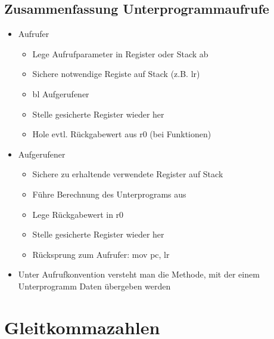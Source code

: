 		
	\subsection{Zusammenfassung Unterprogrammaufrufe}
		\begin{itemize}
			\item Aufrufer
				\begin{itemize}
					\item Lege Aufrufparameter in Register oder Stack ab
					\item Sichere notwendige Registe auf Stack (z.B. lr)
					\item bl Aufgerufener
					\item Stelle gesicherte Register wieder her
					\item Hole evtl. Rückgabewert aus r0 (bei Funktionen)
				\end{itemize}
			\item Aufgerufener
				\begin{itemize}
					\item Sichere zu erhaltende verwendete Register auf Stack
					\item Führe Berechnung des Unterprograms aus
					\item Lege Rückgabewert in r0
					\item Stelle gesicherte Register wieder her
					\item Rücksprung zum Aufrufer: mov pc, lr
				\end{itemize}
			\item Unter Aufrufkonvention versteht man die Methode, mit der einem Unterprogramm Daten übergeben werden
		\end{itemize}


			
\newpage
\section{Gleitkommazahlen}

